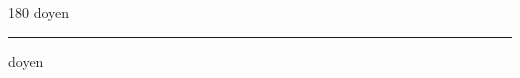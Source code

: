 
\begin{frame}
\begin{center}
\begin{turn}{180}
{\fontsize{2.5cm}{1em}\selectfont doyen}
\end{turn}
\vspace{1em}\par  
\hrule
\vspace{1em}\par  
{\fontsize{2.5cm}{1em}\selectfont doyen}
\end{center}
\end{frame}
